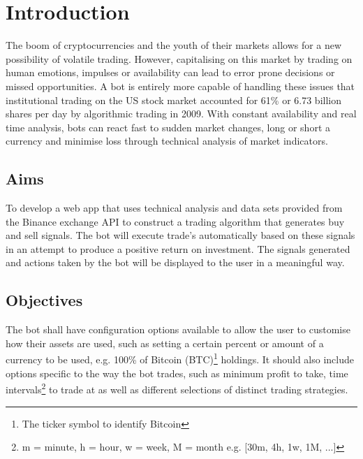 
\chapter{Introduction}
\label{sec:intro}


The boom of cryptocurrencies and the youth of their markets allows for a new possibility of volatile trading. However, capitalising on this market by trading on human emotions, impulses or availability can lead to error prone decisions or missed opportunities. A bot is entirely more capable of handling these issues that institutional trading on the US stock market accounted for 61\% or 6.73 billion shares \cite{WEB:Cheng:2017} per day by algorithmic trading in 2009. With constant availability and real time analysis, bots can react fast to sudden market changes, long or short a currency and minimise loss through technical analysis of market indicators. \par






\section{Aims}
\label{sec:intro:aims}
\noindent To develop a web app that uses technical analysis and data sets provided from the Binance exchange API \cite{WEB:BINANCE_API:2018} to construct a trading algorithm that generates buy and sell signals. The bot will execute trade's automatically based on these signals in an attempt to produce a positive return on investment. The signals generated and actions taken by the bot will be displayed to the user in a meaningful way.


\section{Objectives}
\label{sec:intro:objectives}
\noindent The bot shall have configuration options available to allow the user to customise how their assets are used, such as setting a certain percent or amount of a currency to be used, e.g. 100\% of Bitcoin (BTC)\footnote{The ticker symbol to identify Bitcoin} holdings. It should also include options specific to the way the bot trades, such as minimum profit to take, time intervals\footnote{m = minute, h = hour, w = week, M = month e.g. [30m, 4h, 1w, 1M, ...]} to trade at as well as different selections of distinct trading strategies.

